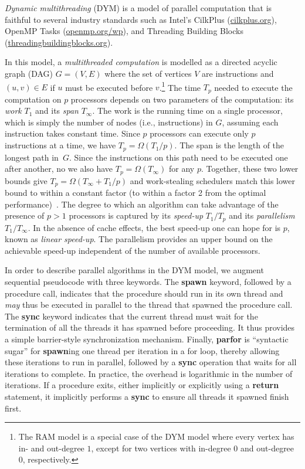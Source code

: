 {\em Dynamic multithreading} (DYM) \cite[Chapter~27]{Cormen2009} is a
model of parallel computation that is faithful to several industry standards
such as Intel's CilkPlus (\url{cilkplus.org}), OpenMP Tasks
(\url{openmp.org/wp}), and Threading Building
Blocks (\url{threadingbuildingblocks.org}).

In this model, a {\em multithreaded computation} is modelled as a directed
acyclic graph (DAG) $G=(V,E)$ where the set of vertices $V$ are instructions
and $(u,v) \in E$ if $u$ must be executed before $v$.\footnote{The
  RAM model is a special case of the DYM model where every vertex has in-
  and out-degree $1$, except for two vertices with in-degree $0$ and
  out-degree $0$, respectively.}
The time $T_p$ needed to execute the computation on $p$ processors depends on
two parameters of the computation: its {\em work} $T_1$ and its {\em span}
$T_\infty$.
The work is the running time on a single processor, which is simply the
number of nodes (i.e., instructions) in $G$, assuming each instruction takes
constant time.
Since $p$ processors can execute only $p$ instructions at a time, we have
$T_p = \Omega(T_1/p)$.
The span is the length of the longest path in~$G$.
Since the instructions on this path need to be executed one after another, no
we also have $T_p = \Omega(T_\infty)$ for any $p$.
Together, these two lower bounds give $T_p = \Omega(T_\infty + T_1/p)$ and
work-stealing schedulers match this lower bound to within a constant factor
(to within a factor 2 from the optimal
performance)~\cite{Blumofe:1999:SMC:324133.324234}.
The degree to which an algorithm can take advantage of the presence of $p > 1$
processors is captured by its {\em speed-up} $T_1 / T_p$ and its
{\em parallelism} $T_1 / T_\infty$.
In the absence of cache effects, the best speed-up one can hope for is $p$,
known as {\em linear speed-up}.
The parallelism provides an upper bound on the achievable speed-up independent
of the number of available processors.

In order to describe parallel algorithms in the DYM model, we augment sequential
pseudocode with three keywords.
The {\bf spawn} keyword, followed by a procedure call, indicates that the
procedure should run in its own thread and {\em may} thus be executed in
parallel to the thread that spawned the procedure call.
The {\bf sync} keyword indicates that the current thread must wait for the
termination of all the threads it has spawned before proceeding.
It thus provides a simple barrier-style synchronization mechanism.
Finally, {\bf parfor} is ``syntactic sugar'' for {\bf spawn}ing one thread per
iteration in a for loop, thereby allowing these iterations to run in parallel,
followed by a {\bf sync} operation that waits for all iterations to complete.
In practice, the overhead is logarithmic in the number of iterations.
If a procedure exits, either implicitly or explicitly using a {\bf return}
statement, it implicitly performs a {\bf sync} to ensure all threads it spawned
finish first.

